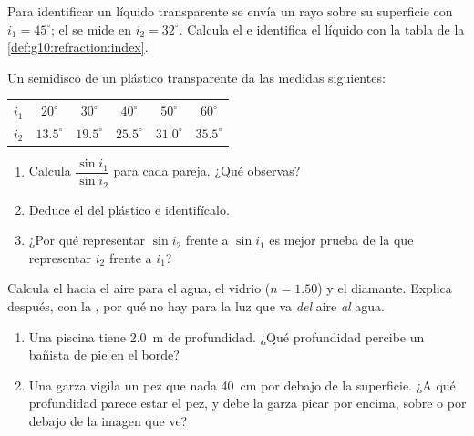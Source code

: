 \begin{exercise}[$\star$]\label{exo:g10:refraction:5}
Para identificar un líquido transparente se envía un rayo sobre su
superficie con $i_1 = 45^\circ$; el  se mide en
$i_2 = 32^\circ$. Calcula el  e identifica el
líquido con la tabla de la \cref{def:g10:refraction:index}.
\end{exercise}

\begin{exercise}[$\star\star$]\label{exo:g10:refraction:6}
Un semidisco de un plástico transparente da las medidas siguientes:
\begin{center}
\begin{tabular}{lccccc}
$i_1$ & $20^\circ$ & $30^\circ$ & $40^\circ$ & $50^\circ$ & $60^\circ$ \\
$i_2$ & $13.5^\circ$ & $19.5^\circ$ & $25.5^\circ$ & $31.0^\circ$
      & $35.5^\circ$ \\
\end{tabular}
\end{center}
\begin{enumerate}
  \item Calcula $\dfrac{\sin i_1}{\sin i_2}$ para cada pareja. ¿Qué
        observas?
  \item Deduce el  del plástico e identifícalo.
  \item ¿Por qué representar $\sin i_2$ frente a $\sin i_1$ es mejor
        prueba de la  que representar $i_2$ frente a $i_1$?
\end{enumerate}
\end{exercise}

\begin{exercise}[$\star\star$]\label{exo:g10:refraction:7}
Calcula el  hacia el aire para el agua, el vidrio
($n = 1.50$) y el diamante. Explica después, con la , por
qué no hay  para la luz que va \emph{del} aire \emph{al}
agua.
\end{exercise}

\begin{exercise}[$\star\star$]\label{exo:g10:refraction:8}
\begin{enumerate}
  \item Una piscina tiene \qty{2.0}{m} de profundidad. ¿Qué profundidad
        percibe un bañista de pie en el borde?
  \item Una garza vigila un pez que nada \qty{40}{cm} por debajo de la
        superficie. ¿A qué profundidad parece estar el pez, y debe la
        garza picar por encima, sobre o por debajo de la imagen que ve?
\end{enumerate}
\end{exercise}

